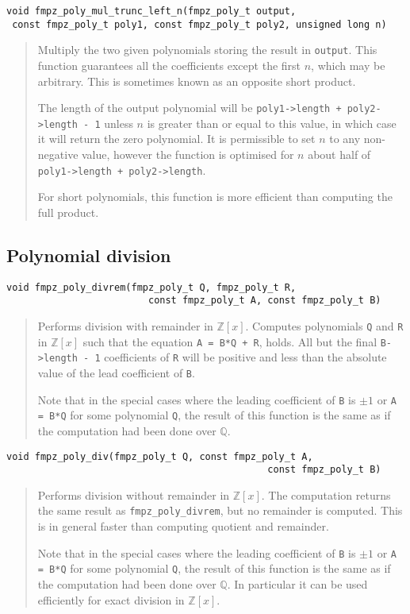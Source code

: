 \documentclass[a4paper,10pt]{article}
\newcommand{\Z}{\mathbb{Z}}
\newcommand{\Q}{\mathbb{Q}}
\newcommand{\code}{\lstinline}
\begin{document}
\begin{lstlisting}
void fmpz_poly_mul_trunc_left_n(fmpz_poly_t output, 
 const fmpz_poly_t poly1, const fmpz_poly_t poly2, unsigned long n) 
\end{lstlisting}
\begin{quote}
Multiply the two given polynomials storing the result in \code{output}. This function guarantees all the coefficients except the first $n$, which may be arbitrary. This is sometimes known as an opposite short product.

The length of the output polynomial will be \code{poly1->length + poly2->length - 1} unless $n$ is greater than or equal to this value, in which case it will return the zero polynomial. It is permissible to set $n$ to any non-negative value, however the function is optimised for $n$ about half of \code{poly1->length + poly2->length}.

For short polynomials, this function is more efficient than computing the full product.
\end{quote}

\subsection{Polynomial division}

\begin{lstlisting}
void fmpz_poly_divrem(fmpz_poly_t Q, fmpz_poly_t R, 
                         const fmpz_poly_t A, const fmpz_poly_t B) 
\end{lstlisting}
\begin{quote}
Performs division with remainder in $\Z[x]$. Computes polynomials \code{Q} and \code{R} in $\Z[x]$ such that the equation \code{A = B*Q + R}, holds. All but the final \code{B->length - 1} coefficients of \code{R} will be positive and less than the absolute value of the lead coefficient of \code{B}.

Note that in the special cases where the leading coefficient of \code{B} is $\pm 1$ or \code{A = B*Q} for some polynomial \code{Q}, the result of this function is the same as if the computation had been done over $\Q$.
\end{quote}

\begin{lstlisting}
void fmpz_poly_div(fmpz_poly_t Q, const fmpz_poly_t A, 
                                              const fmpz_poly_t B) 
\end{lstlisting}
\begin{quote}
Performs division without remainder in $\Z[x]$. The computation returns the same result as \code{fmpz_poly_divrem}, but no remainder is computed. This is in general faster than computing quotient and remainder. 

Note that in the special cases where the leading coefficient of \code{B} is $\pm 1$ or \code{A = B*Q} for some polynomial \code{Q}, the result of this function is the same as if the computation had been done over $\Q$. In particular it can be used efficiently for exact division in $\Z[x]$.
\end{quote}
\end{document}
